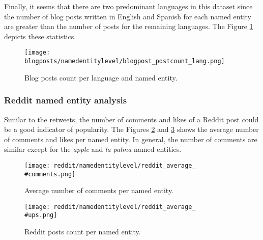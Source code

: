 \par Finally, it seems that there are two predominant languages in this dataset since the number of blog posts written in English and Spanish for each named entity are greater than the number of posts for the remaining languages. The Figure \ref{fig:blogposts_postcount_lang_entity} depicts these statistics.
\begin{figure}[H]
	\begin{center}
		\texttt{[image: blogposts/namedentitylevel/blogpost\_postcount\_lang.png]}
		\caption{Blog posts count per language and named entity.}
		\label{fig:blogposts_postcount_lang_entity}
	\end{center}
\end{figure}



\subsubsection{Reddit named entity analysis}

\par Similar to the retweets, the number of comments and likes of a Reddit post could be a good indicator of popularity. The Figures \ref{fig:reddit_average_comments_entity} and \ref{fig:reddit_average_ups_entity} shows the average number of comments and likes per named entity. In general, the number of comments are similar except for the \textit{apple} and \textit{la palma} named entities.

\begin{figure}[H]
	\begin{center}
		\texttt{[image: reddit/namedentitylevel/reddit\_average\_\\\#comments.png]}
		\caption{Average number of comments per named entity.}
		\label{fig:reddit_average_comments_entity}
	\end{center}
\end{figure}

\begin{figure}[H]
	\begin{center}
		\texttt{[image: reddit/namedentitylevel/reddit\_average\_\\\#ups.png]}
		\caption{Reddit posts count per named entity.}
		\label{fig:reddit_average_ups_entity}
	\end{center}
\end{figure}

